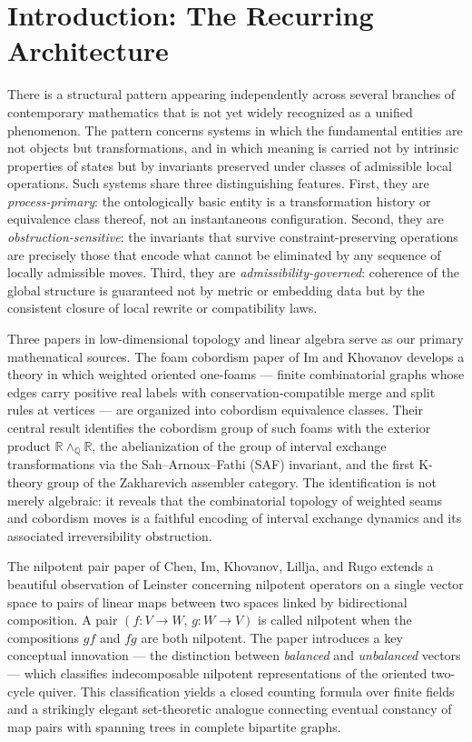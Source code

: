 \documentclass[12pt, a4paper]{article}
\theoremstyle{plain}
\theoremstyle{definition}
\theoremstyle{correspondence}
\newcommand{\RR}{\mathbb{R}}
\newcommand{\QQ}{\mathbb{Q}}
\newcommand{\wedgeQ}{\wedge_{\QQ}}
\begin{document}
\tableofcontents
\newpage

\section{Introduction: The Recurring Architecture}

There is a structural pattern appearing independently across several branches of
contemporary mathematics that is not yet widely recognized as a unified phenomenon.
The pattern concerns systems in which the fundamental entities are not objects but
transformations, and in which meaning is carried not by intrinsic properties of states
but by invariants preserved under classes of admissible local operations. Such systems
share three distinguishing features. First, they are \emph{process-primary}: the
ontologically basic entity is a transformation history or equivalence class thereof,
not an instantaneous configuration. Second, they are \emph{obstruction-sensitive}: the
invariants that survive constraint-preserving operations are precisely those that encode
what cannot be eliminated by any sequence of locally admissible moves. Third, they are
\emph{admissibility-governed}: coherence of the global structure is guaranteed not by
metric or embedding data but by the consistent closure of local rewrite or compatibility
laws.

Three papers in low-dimensional topology and linear algebra serve as our primary
mathematical sources. The foam cobordism paper of Im and Khovanov \cite{IK24foam}
develops a theory in which weighted oriented one-foams --- finite combinatorial graphs
whose edges carry positive real labels with conservation-compatible merge and split
rules at vertices --- are organized into cobordism equivalence classes. Their central
result identifies the cobordism group of such foams with the exterior product
$\RR \wedgeQ \RR$, the abelianization of the group of interval exchange transformations
via the Sah--Arnoux--Fathi (SAF) invariant, and the first K-theory group of the
Zakharevich assembler category. The identification is not merely algebraic: it reveals
that the combinatorial topology of weighted seams and cobordism moves is a faithful
encoding of interval exchange dynamics and its associated irreversibility obstruction.

The nilpotent pair paper of Chen, Im, Khovanov, Lillja, and Rugo \cite{CIKLR25} extends
a beautiful observation of Leinster concerning nilpotent operators on a single vector
space to pairs of linear maps between two spaces linked by bidirectional composition.
A pair $(f : V \to W,\, g : W \to V)$ is called nilpotent when the compositions $gf$
and $fg$ are both nilpotent. The paper introduces a key conceptual innovation --- the
distinction between \emph{balanced} and \emph{unbalanced} vectors --- which classifies
indecomposable nilpotent representations of the oriented two-cycle quiver. This
classification yields a closed counting formula over finite fields and a strikingly
elegant set-theoretic analogue connecting eventual constancy of map pairs with spanning
trees in complete bipartite graphs.
\end{document}

